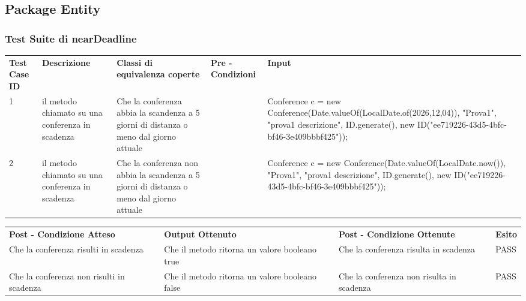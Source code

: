 \subsection{Package Entity}
\label{sec:test_funzionale_package_entity}

\subsubsection{Test Suite di nearDeadline}
\begin{tabular}{|p{2.5cm}|p{2.5cm}|p{3cm}|p{1.5cm}|p{5cm}|}
\hline
\rowcolor{SkyBlue}
\multicolumn{5}{l}{\textbf{p1}}\\
\hline
\rowcolor{Red}
\textbf{Test Case ID} & \textbf{Descrizione} & \textbf{Classi di equivalenza coperte} & \textbf{Pre - Condizioni} & \textbf{Input} \\
\hline
1&il metodo chiamato su una conferenza in scadenza&Che la conferenza abbia la scandenza a 5 giorni di distanza o meno dal giorno attuale&&Conference c = new Conference(Date.valueOf(LocalDate.of(2026,12,04)), "Prova1", "prova1 descrizione", ID.generate(), new ID("ee719226-43d5-4bfc-bf46-3e409bbbf425"));\\
\hline
2&il metodo chiamato su una conferenza in scadenza&Che la conferenza non abbia la scandenza a 5 giorni di distanza o meno dal giorno attuale&&Conference c = new Conference(Date.valueOf(LocalDate.now()), "Prova1", "prova1 descrizione", ID.generate(), new ID("ee719226-43d5-4bfc-bf46-3e409bbbf425"));\\
\hline
\end{tabular}


\begin{tabular}{|p{3.5cm}|p{3cm}|p{3cm}|p{1cm}|}
\hline
\rowcolor{SkyBlue}
\multicolumn{4}{l}{\textbf{p2}}\\
\hline
\rowcolor{Red}
 \textbf{Post - Condizione Atteso} & \textbf{Output Ottenuto}& \textbf{Post - Condizione Ottenute}& \textbf{Esito}\\
\hline
Che la conferenza risulti in scadenza&Che il metodo ritorna un valore booleano true&Che la conferenza risulta in scadenza&PASS\\
\hline
Che la conferenza non risulti in scadenza&Che il metodo ritorna un valore booleano false&Che la conferenza non risulta in scadenza&PASS\\
\hline
\end{tabular}

